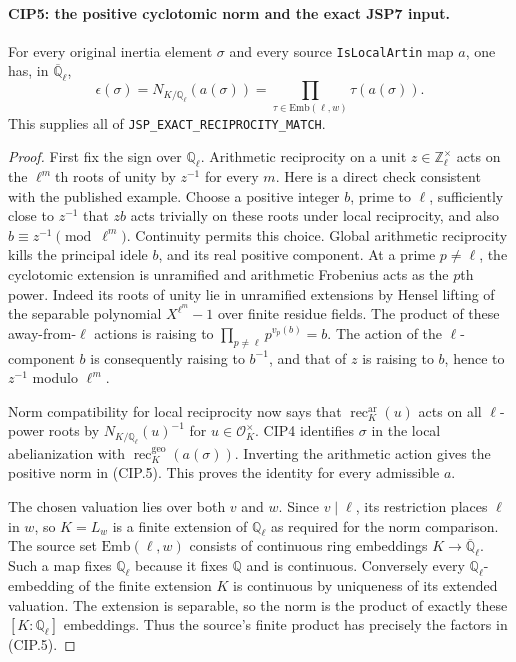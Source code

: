 \paragraph{CIP5: the positive cyclotomic norm and the exact JSP7 input.}
\label{claim:CIP5}
For every original inertia element $\sigma$ and every source
\texttt{IsLocalArtin} map $a$, one has, in
$\overline{\mathbb Q}_\ell$,
\[
 \epsilon(\sigma)=N_{K/\mathbb Q_\ell}(a(\sigma))
       =\prod_{\tau\in\mathrm{Emb}(\ell,w)}\tau(a(\sigma)).
 \tag{CIP.5}
\]
This supplies all of \texttt{JSP\_EXACT\_RECIPROCITY\_MATCH}.
\begin{proof}
First fix the sign over $\mathbb Q_\ell$.  Arithmetic reciprocity
on a unit $z\in\mathbb Z_\ell^\times$ acts on the
$\ell^m$th roots of unity by $z^{-1}$ for every $m$.
Here is a direct check consistent with the published example.
Choose a positive integer $b$, prime to $\ell$, sufficiently close
to $z^{-1}$ that $zb$ acts trivially on these roots under local
reciprocity, and also $b\equiv z^{-1}\pmod{\ell^m}$.
Continuity permits this choice.  Global arithmetic reciprocity
kills the principal idele $b$, and its real positive component.
At a prime $p\ne\ell$, the cyclotomic extension is unramified and
arithmetic Frobenius acts as the $p$th power.  Indeed its roots of
unity lie in unramified extensions by Hensel lifting of the
separable polynomial $X^{\ell^m}-1$ over finite residue fields.
The product of these away-from-$\ell$ actions is raising to
$\prod_{p\ne\ell}p^{v_p(b)}=b$.  The action of the $\ell$-component
$b$ is consequently raising to $b^{-1}$, and that of $z$ is
raising to $b$, hence to $z^{-1}$ modulo $\ell^m$.

Norm compatibility for local reciprocity now says that
$\operatorname{rec}^{\mathrm{ar}}_K(u)$ acts on all
$\ell$-power roots by $N_{K/\mathbb Q_\ell}(u)^{-1}$ for
$u\in\mathcal O_K^\times$.  CIP4 identifies
$\sigma$ in the local abelianization with
$\operatorname{rec}^{\mathrm{geo}}_K(a(\sigma))$.
Inverting the arithmetic action gives the positive norm in
(CIP.5).  This proves the identity for every admissible $a$.

The chosen valuation lies over both $v$ and $w$.  Since $v\mid\ell$,
its restriction places $\ell$ in $w$, so $K=L_w$ is a finite
extension of $\mathbb Q_\ell$ as required for the norm comparison.
The source set $\mathrm{Emb}(\ell,w)$ consists of continuous ring
embeddings $K\to\overline{\mathbb Q}_\ell$.  Such a map fixes
$\mathbb Q_\ell$ because it fixes $\mathbb Q$ and is continuous.
Conversely every $\mathbb Q_\ell$-embedding of the finite extension
$K$ is continuous by uniqueness of its extended valuation.
The extension is separable, so the norm is the product of exactly
these $[K:\mathbb Q_\ell]$ embeddings.  Thus the source's finite
product has precisely the factors in (CIP.5).


\end{proof}
